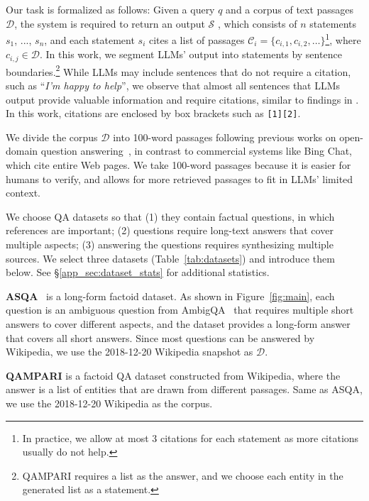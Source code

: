 \documentclass[11pt]{article}
\newcommand\ti[1]{\textit{#1}}
\begin{document}
\label{sec:task_def}

Our task is formalized as follows:
Given a query $q$ and a corpus of text passages $\mathcal{D}$,
the system %
is required to return an output $\mathcal{S}$%
, which consists of $n$ statements $s_1$, ..., $s_n$, 
and each statement $s_i$ cites a list of passages $\mathcal{C}_i = \{c_{i,1}, c_{i, 2}, \ldots\}$\footnote{In practice, we allow at most 3 citations for each statement as more citations usually do not help.}, where $c_{i,j}\in \mathcal{D}$. 
In this work,
we segment LLMs' output into statements by sentence boundaries.\footnote{
    QAMPARI requires a list as the answer, and we choose each entity in the generated list as a statement.} 
While LLMs may include sentences that do not require a citation, such as ``\ti{I'm happy to help}'', 
we observe that almost all sentences that LLMs output  provide valuable information and  require citations, similar to findings in
\citet{liu2023evaluating}. 
In this work, citations are enclosed by box brackets such as \texttt{[1][2]}.

We divide the corpus $\mathcal{D}$ into 100-word passages following previous works on open-domain question answering~\cite{karpukhin-etal-2020-dense,petroni-etal-2021-kilt,piktus2021web},
in contrast to
commercial systems like Bing Chat, which cite entire Web pages. %
We take  100-word passages because
it is easier for humans to verify, and %
allows for more retrieved passages to fit in LLMs' limited context.  %


We choose QA datasets so that 
(1) they contain factual questions, in which references are important; 
(2) questions require long-text answers that cover multiple aspects; %
(3) answering the questions  requires synthesizing multiple sources.
We select three datasets %
(Table~\ref{tab:datasets}) and introduce them below. %
See \S\ref{app_sec:dataset_stats} for additional statistics. 

 
\textbf{ASQA}~\cite{stelmakh2022asqa} is a long-form factoid dataset.
As shown in Figure~\ref{fig:main}, 
each question is an ambiguous question from AmbigQA~\cite{min-etal-2020-ambigqa} that requires multiple short answers to cover different aspects, 
and the dataset provides a long-form answer that covers all short answers.
Since most questions can be answered by Wikipedia, we use the 2018-12-20 Wikipedia snapshot as $\mathcal{D}$.  


\textbf{QAMPARI} \cite{rubin2022qampari}  
is a factoid QA dataset constructed from Wikipedia,
where the answer is a list of entities that are  drawn from different passages.
Same as ASQA, we use the 2018-12-20 Wikipedia as the corpus.%
\end{document}
